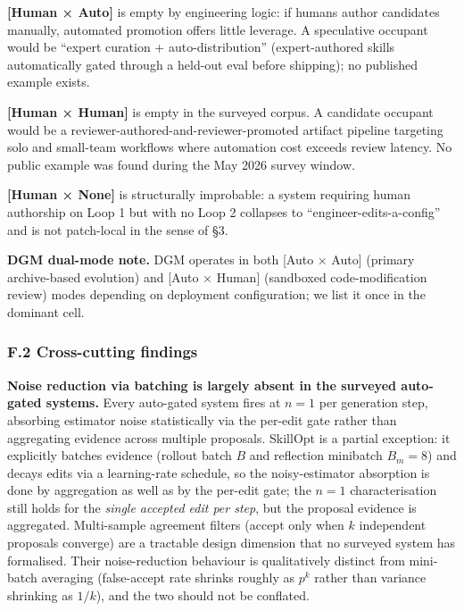 \textbf{{[}Human × Auto{]}} is empty by engineering logic: if humans
author candidates manually, automated promotion offers little leverage.
A speculative occupant would be ``expert curation + auto-distribution''
(expert-authored skills automatically gated through a held-out eval
before shipping); no published example exists.

\textbf{{[}Human × Human{]}} is empty in the surveyed corpus. A
candidate occupant would be a reviewer-authored-and-reviewer-promoted
artifact pipeline targeting solo and small-team workflows where
automation cost exceeds review latency. No public example was found
during the May 2026 survey window.

\textbf{{[}Human × None{]}} is structurally improbable: a system
requiring human authorship on Loop 1 but with no Loop 2 collapses to
``engineer-edits-a-config'' and is not patch-local in the sense of §3.

\textbf{DGM dual-mode note.} DGM operates in both {[}Auto × Auto{]}
(primary archive-based evolution) and {[}Auto × Human{]} (sandboxed
code-modification review) modes depending on deployment configuration;
we list it once in the dominant cell.

\subsubsection{F.2 Cross-cutting
findings}\label{f.2-cross-cutting-findings}

\textbf{Noise reduction via batching is largely absent in the surveyed
auto-gated systems.} Every auto-gated system fires at \(n = 1\) per
generation step, absorbing estimator noise statistically via the
per-edit gate rather than aggregating evidence across multiple
proposals. SkillOpt is a partial exception: it explicitly batches
evidence (rollout batch \(B\) and reflection minibatch \(B_m{=}8\)) and
decays edits via a learning-rate schedule, so the noisy-estimator
absorption is done by aggregation as well as by the per-edit gate; the
\(n{=}1\) characterisation still holds for the \emph{single accepted edit
per step}, but the proposal evidence is aggregated. Multi-sample
agreement filters (accept only when \(k\) independent proposals
converge) are a tractable design dimension that no surveyed system has
formalised. Their noise-reduction behaviour is qualitatively distinct
from mini-batch averaging (false-accept rate shrinks roughly as \(p^k\)
rather than variance shrinking as \(1/k\)), and the two should not be
conflated.

